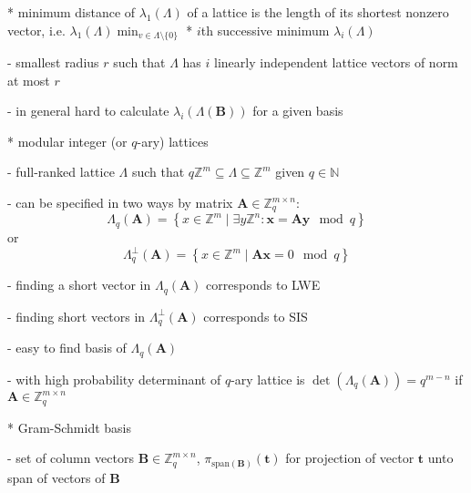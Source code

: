 \documentclass[
  a4paper,  %
  twoside,  %
  bibliography=totoc,
  headsepline,
  cleardoublepage=empty,
  parskip=half,
  draft=false
]{scrbook}
\begin{document}
  * minimum distance of $\lambda_1(\Lambda)$ of a lattice is the length of its shortest nonzero vector, i.e. $\lambda_1(\Lambda) \min_{v \in \Lambda \setminus \{0\}}$
  * $i$th successive minimum $\lambda_i(\Lambda)$

    - smallest radius $r$ such that $\Lambda$ has $i$ linearly independent lattice vectors of norm at most $r$

    - in general hard to calculate $\lambda_i(\Lambda(\textbf{B}))$ for a given basis  
  
  * modular integer (or $q$-ary) lattices %

    - full-ranked lattice $\Lambda$ such that $q\mathbb{Z}^m \subseteq	\Lambda \subseteq	\mathbb{Z}^m$ given $q \in \mathbb{N}$

    - can be specified in two ways by matrix $\textbf{A} \in \mathbb{Z}_q^{m\times n}$:
    \begin{equation}
      \Lambda_q(\textbf{A}) = \left\{ x \in \mathbb{Z}^m \mid \exists y \mathbb{Z}^n : \textbf{x} = \textbf{A}\textbf{y} \mod q \right\}
    \end{equation}
    or
    \begin{equation}
      \Lambda_q^\perp(\textbf{A}) = \left\{ x \in \mathbb{Z}^m \mid  \textbf{A}\textbf{x} = 0 \mod q \right\}
    \end{equation}

    - finding a short vector in $\Lambda_q(\textbf{A})$ corresponds to LWE %

    - finding short vectors in $\Lambda_q^\perp(\textbf{A})$ corresponds to SIS %

    - easy to find basis of $\Lambda_q(\textbf{A})$ \cite{AFG13}

    - with high probability determinant of $q$-ary lattice is $\det(\Lambda_q(\textbf{A}))=q^{m-n}$ if $\textbf{A} \in \mathbb{Z}_q^{m\times n}$


  * Gram-Schmidt basis

    - set of column vectors $\textbf{B} \in \mathbb{Z}_q^{m\times n}$, $\pi_{\text{span}(\textbf{B})}(\textbf{t})$ for projection of vector $\textbf{t}$ unto span of vectors of $\textbf{B}$
\end{document}

